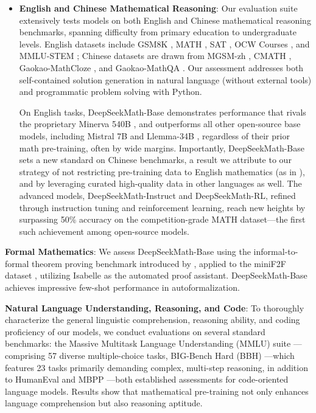 \begin{itemize}[topsep=0pt]
    \item \textbf{English and Chinese Mathematical Reasoning}: Our evaluation suite extensively tests models on both English and Chinese mathematical reasoning benchmarks, spanning difficulty from primary education to undergraduate levels. English datasets include GSM8K \citep{gsm8k}, MATH \citep{MATH}, SAT \citep{llemma}, OCW Courses \citep{minerva}, and MMLU-STEM \citep{mmlu}; Chinese datasets are drawn from MGSM-zh \citep{mgsm}, CMATH \citep{wei2023cmath}, Gaokao-MathCloze \citep{agieval}, and Gaokao-MathQA \citep{agieval}. Our assessment addresses both self-contained solution generation in natural language (without external tools) and programmatic problem solving with Python.

    On English tasks, DeepSeekMath-Base demonstrates performance that rivals the proprietary Minerva 540B \citep{minerva}, and outperforms all other open-source base models, including Mistral 7B \citep{mistral} and Llemma-34B \citep{llemma}, regardless of their prior math pre-training, often by wide margins. Importantly, DeepSeekMath-Base sets a new standard on Chinese benchmarks, a result we attribute to our strategy of not restricting pre-training data to English mathematics (as in \citep{minerva,llemma}), and by leveraging curated high-quality data in other languages as well. The advanced models, DeepSeekMath-Instruct and DeepSeekMath-RL, refined through instruction tuning and reinforcement learning, reach new heights by surpassing 50\% accuracy on the competition-grade MATH dataset—the first such achievement among open-source models.
\end{itemize}

\item \textbf{Formal Mathematics}: We assess DeepSeekMath-Base using the informal-to-formal theorem proving benchmark introduced by \citep{dsp_proof}, applied to the miniF2F dataset \citep{minif2f}, utilizing Isabelle \citep{isabelle} as the automated proof assistant. DeepSeekMath-Base achieves impressive few-shot performance in autoformalization.
\item \textbf{Natural Language Understanding, Reasoning, and Code}: To thoroughly characterize the general linguistic comprehension, reasoning ability, and coding proficiency of our models, we conduct evaluations on several standard benchmarks: the Massive Multitask Language Understanding (MMLU) suite \citep{mmlu}—comprising 57 diverse multiple-choice tasks, BIG-Bench Hard (BBH) \citep{bbh}—which features 23 tasks primarily demanding complex, multi-step reasoning, in addition to HumanEval \citep{codex} and MBPP \citep{mbpp}—both established assessments for code-oriented language models. Results show that mathematical pre-training not only enhances language comprehension but also reasoning aptitude.

